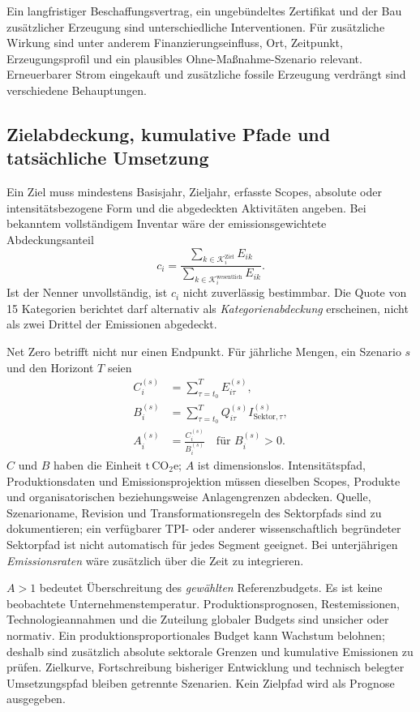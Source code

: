 \documentclass[11pt,a4paper]{article}
\newcommand{\tonnen}{\ensuremath{\mathrm{t\,CO}_{2}\mathrm{e}}}
\begin{document}
Ein langfristiger Beschaffungsvertrag, ein ungebündeltes Zertifikat und der Bau zusätzlicher Erzeugung sind unterschiedliche Interventionen. Für zusätzliche Wirkung sind unter anderem Finanzierungseinfluss, Ort, Zeitpunkt, Erzeugungsprofil und ein plausibles Ohne-Maßnahme-Szenario relevant. \glqq Erneuerbarer Strom eingekauft\grqq{} und \glqq zusätzliche fossile Erzeugung verdrängt\grqq{} sind verschiedene Behauptungen.

\subsection{Zielabdeckung, kumulative Pfade und tatsächliche Umsetzung}
Ein Ziel muss mindestens Basisjahr, Zieljahr, erfasste Scopes, absolute oder intensitätsbezogene Form und die abgedeckten Aktivitäten angeben. Bei bekanntem vollständigem Inventar wäre der emissionsgewichtete Abdeckungsanteil
\begin{equation}
c_i=\frac{\sum_{k\in\mathcal K_i^{\mathrm{Ziel}}}E_{ik}}{\sum_{k\in\mathcal K_i^{\mathrm{wesentlich}}}E_{ik}}.
\end{equation}
Ist der Nenner unvollständig, ist $c_i$ nicht zuverlässig bestimmbar. Die Quote  von 15 Kategorien berichtet\grqq{} darf alternativ als \emph{Kategorienabdeckung} erscheinen, nicht als \glqq zwei Drittel der Emissionen abgedeckt\grqq.

Net Zero betrifft nicht nur einen Endpunkt. Für jährliche Mengen, ein Szenario $s$ und den Horizont $T$ seien
\begin{align}
C_i^{(s)}&=\sum_{\tau=t_0}^{T}E_{i\tau}^{(s)},\\
B_i^{(s)}&=\sum_{\tau=t_0}^{T}Q_{i\tau}^{(s)}I_{\mathrm{Sektor},\tau}^{(s)},\\
A_i^{(s)}&=\frac{C_i^{(s)}}{B_i^{(s)}}\quad\text{für }B_i^{(s)}>0.
\label{eq:budget}
\end{align}
$C$ und $B$ haben die Einheit \tonnen; $A$ ist dimensionslos. Intensitätspfad, Produktionsdaten und Emissionsprojektion müssen dieselben Scopes, Produkte und organisatorischen beziehungsweise Anlagengrenzen abdecken. Quelle, Szenarioname, Revision und Transformationsregeln des Sektorpfads sind zu dokumentieren; ein verfügbarer TPI- oder anderer wissenschaftlich begründeter Sektorpfad ist nicht automatisch für jedes Segment geeignet. Bei unterjährigen \emph{Emissionsraten} wäre zusätzlich über die Zeit zu integrieren.

$A>1$ bedeutet Überschreitung des \emph{gewählten} Referenzbudgets. Es ist keine beobachtete Unternehmenstemperatur. Produktionsprognosen, Restemissionen, Technologieannahmen und die Zuteilung globaler Budgets sind unsicher oder normativ. Ein produktionsproportionales Budget kann Wachstum belohnen; deshalb sind zusätzlich absolute sektorale Grenzen und kumulative Emissionen zu prüfen. Zielkurve, Fortschreibung bisheriger Entwicklung und technisch belegter Umsetzungspfad bleiben getrennte Szenarien. Kein Zielpfad wird als Prognose ausgegeben.
\end{document}

